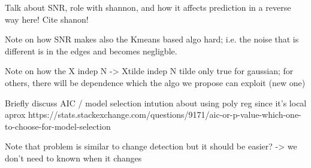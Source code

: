 Talk about SNR, role with shannon, and how it affects prediction in a reverse way here! Cite shanon!

Note on how SNR makes also the Kmeans based algo hard; i.e. the noise that is different is 
in the edges and becomes negligble.

Note on how the X indep N -> Xtilde indep N tilde only true for gaussian; for others, there 
will be dependence which the algo we propose can exploit (new one)


Briefly discuss AIC / model selection
intution about using poly reg since it's local
aprox
https://stats.stackexchange.com/questions/9171/aic-or-p-value-which-one-to-choose-for-model-selection

Note that problem is similar to change detection
but it should be easier? -> we don't need to known
when it changes
